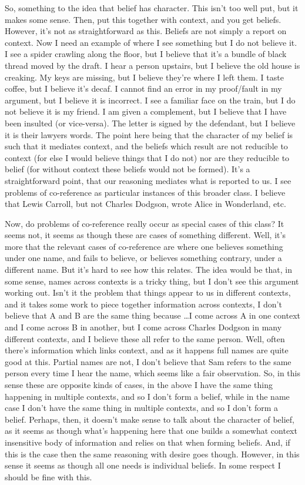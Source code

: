 \documentclass[10pt]{article}
\begin{document}
So, something to the idea that belief has character.
This isn't too well put, but it makes some sense.
Then, put this together with context, and you get beliefs.
However, it's not as straightforward as this.
Beliefs are not simply a report on context.
Now I need an example of where I see something but I do not believe it.
I see a spider crawling along the floor, but I believe that it's a bundle of black thread moved by the draft.
I hear a person upstairs, but I believe the old house is creaking.
My keys are missing, but I believe they're where I left them.
I taste coffee, but I believe it's decaf.
I cannot find an error in my proof/fault in my argument, but I believe it is incorrect.
I see a familiar face on the train, but I do not believe it is my friend.
I am given a complement, but I believe that I have been insulted (or vice-versa).
The letter is signed by the defendant, but I believe it is their lawyers words.
The point here being that the character of my belief is such that it mediates context, and the beliefs which result are not reducible to context (for else I would believe things that I do not) nor are they reducible to belief (for without context these beliefs would not be formed).
It's a straightforward point, that our reasoning mediates what is reported to us.
I see problems of co-reference as particular instances of this broader class.
I believe that Lewis Carroll, but not Charles Dodgson, wrote Alice in Wonderland, etc.


{\color{red} Now, do problems of co-reference really occur as special cases of this class?
  It seems not, it seems as though these are cases of something different.
  Well, it's more that the relevant cases of co-reference are where one believes something under one name, and fails to believe, or believes something contrary, under a different name.
  But it's hard to see how this relates.
  The idea would be that, in some sense, names across contexts is a tricky thing, but I don't see this argument working out.
  Isn't it the problem that things appear to us in different contexts, and it takes some work to piece together information across contexts, I don't believe that A and B are the same thing because \dots I come across A in one context and I come across B in another, but I come across Charles Dodgson in many different contexts, and I believe these all refer to the same person.
  Well, often there's information which links context, and as it happens full names are quite good at this.
  Partial names are not, I don't believe that Sam refers to the same person every time I hear the name, which seems like a fair observation.
  So, in this sense these are opposite kinds of cases, in the above I have the same thing happening in multiple contexts, and so I don't form a belief, while in the name case I don't have the same thing in multiple contexts, and so I don't form a belief.
  Perhaps, then, it doesn't make sense to talk about the character of belief, as it seems as though what's happening here that one builds a somewhat context insensitive body of information and relies on that when forming beliefs.
  And, if this is the case then the same reasoning with desire goes though.
  However, in this sense it seems as though all one needs is individual beliefs.
  In some respect I should be fine with this.
}
\end{document}
